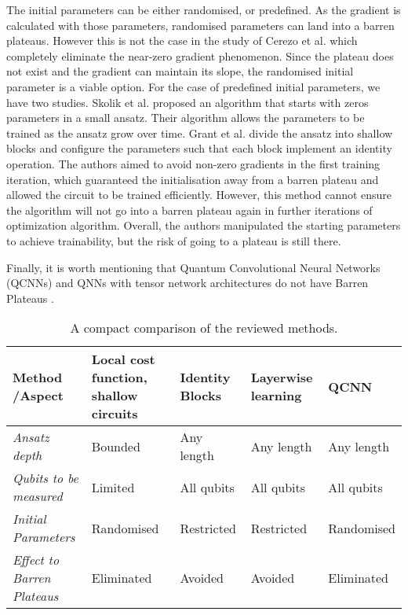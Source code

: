 The initial parameters can be either randomised, or predefined.
As the gradient is calculated with those parameters, randomised parameters can land into a barren plateaus.
However this is not the case in the study of Cerezo et al. which completely eliminate the near-zero gradient phenomenon.
Since the plateau does not exist and the gradient can maintain its slope, the randomised initial parameter is a viable option.
For the case of predefined initial parameters, we have two studies.
Skolik et al. \cite{skolikLayerwiseLearningQuantum2021} proposed an algorithm that starts with zeros parameters in a small ansatz.
Their algorithm allows the parameters to be trained as the ansatz grow over time.
Grant et al. \cite{grantInitializationStrategyAddressing2019} divide the ansatz into shallow blocks and configure the parameters such that each block implement an identity operation.
The authors aimed to avoid non-zero gradients in the first training iteration, which guaranteed the initialisation away from a barren plateau and allowed the circuit to be trained efficiently.
However, this method cannot ensure the algorithm will not go into a barren plateau again in further iterations of optimization algorithm.
Overall, the authors manipulated the starting parameters to achieve trainability, but the risk of going to a plateau is still there.

Finally, it is worth mentioning that Quantum Convolutional Neural Networks (QCNNs) and QNNs with tensor network architectures do not have Barren Plateaus \cite{congQuantumConvolutionalNeural2019}.

\begin{table}[]
    \centering
    \begin{tabular}{|p{3cm}|p{2cm}|p{2cm}|p{2cm}|p{2cm}|}
        \hline
        \textbf{Method /\newline Aspect}             & \textbf{Local cost function, shallow circuits} & \textbf{Identity Blocks} & \textbf{Layerwise learning} & \textbf{QCNN} \\
        \hline \hline
        \raggedright\emph{Ansatz depth}              & Bounded                                        & Any length               & Any length                  & Any length    \\
        \hline
        \raggedright\emph{Qubits to be measured}     & Limited                                        & All qubits               & All qubits                  & All qubits    \\
        \hline
        \raggedright\emph{Initial Parameters}        & Randomised                                     & Restricted               & Restricted                  & Randomised    \\
        \hline \hline
        \raggedright\emph{Effect to Barren Plateaus} & Eliminated                                     & Avoided                  & Avoided                     & Eliminated    \\
        \hline
    \end{tabular}
    \caption{A compact comparison of the reviewed methods.}
    \label{quick comparison of methods}
\end{table}
